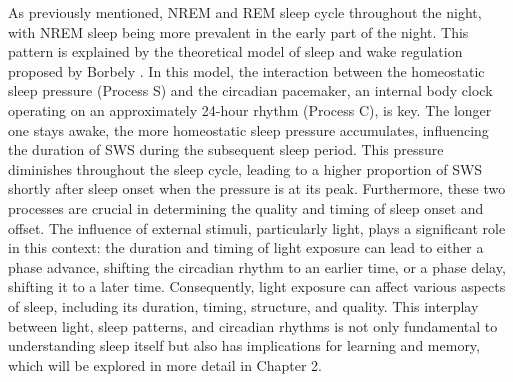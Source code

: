 As previously mentioned, NREM and REM sleep cycle throughout the night, with NREM sleep being more prevalent in the early part of the night. This pattern is explained by the theoretical model of sleep and wake regulation proposed by Borbely \parencite{borbely_two_1982,borbely_two-process_2016}. In this model, the interaction between the homeostatic sleep pressure (Process S) and the circadian pacemaker, an internal body clock operating on an approximately 24-hour rhythm (Process C), is key. The longer one stays awake, the more homeostatic sleep pressure accumulates, influencing the duration of SWS during the subsequent sleep period. This pressure diminishes throughout the sleep cycle, leading to a higher proportion of SWS shortly after sleep onset when the pressure is at its peak. Furthermore, these two processes are crucial in determining the quality and timing of sleep onset and offset. The influence of external stimuli, particularly light, plays a significant role in this context: the duration and timing of light exposure can lead to either a phase advance, shifting the circadian rhythm to an earlier time, or a phase delay, shifting it to a later time. Consequently, light exposure can affect various aspects of sleep, including its duration, timing, structure, and quality. This interplay between light, sleep patterns, and circadian rhythms is not only fundamental to understanding sleep itself but also has implications for learning and memory, which will be explored in more detail in Chapter 2. 
